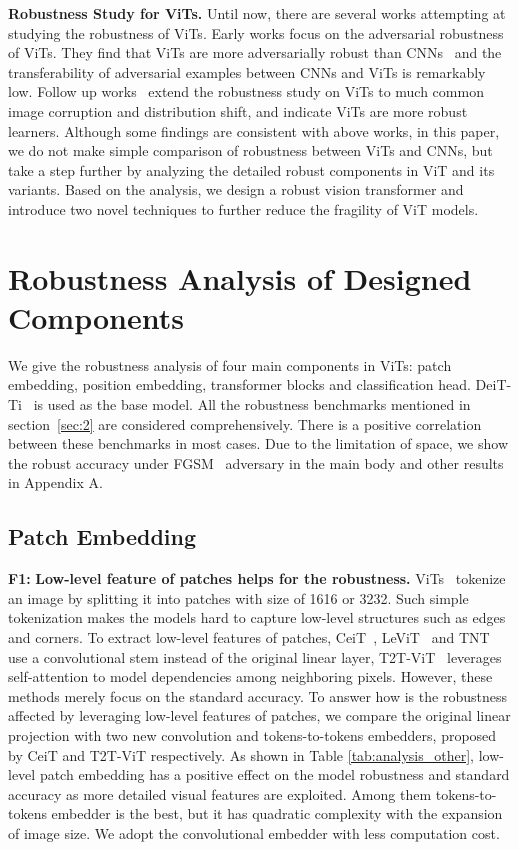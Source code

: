 \documentclass[10pt,twocolumn,letterpaper]{article}
\begin{document}
\textbf{Robustness Study for ViTs.} Until now, there are several works attempting at studying the robustness of ViTs. Early works focus on the adversarial robustness of ViTs. They find that ViTs are more adversarially robust than CNNs~\cite{shao2021adversarial} and the transferability of adversarial examples between CNNs and ViTs is remarkably low\cite{mahmood2021robustness}. Follow up works~\cite{bhojanapalli2021understanding,paul2021vision} extend the robustness study on ViTs to much common image corruption and distribution shift, and indicate ViTs are more robust learners. Although some findings are consistent with above works, in this paper, we do not make simple comparison of robustness between ViTs and CNNs, but take a step further by analyzing the detailed robust components in ViT and its variants. Based on the analysis, we design a robust vision transformer and introduce two novel techniques to further reduce the fragility of ViT models.

\section{Robustness Analysis of Designed Components}
\label{sec:3}

We give the robustness analysis of four main components in ViTs: patch embedding, position embedding, transformer blocks and classification head. DeiT-Ti~\cite{touvron2020training} is used as the base model. All the robustness benchmarks mentioned in section~\ref{sec:2} are considered comprehensively. There is a positive correlation between these benchmarks in most cases. Due to the limitation of space, we show the robust accuracy under FGSM~\cite{goodfellow2014explaining} adversary in the main body and other results in Appendix A.

\subsection{Patch Embedding}
\textbf{F1: } \textbf{Low-level feature of patches helps for the robustness.} ViTs~\cite{dosovitskiy2020image} tokenize an image by splitting it into patches with size of 1616 or 3232. Such simple tokenization makes the models hard to capture low-level structures such as edges and corners. 
To extract low-level features of patches, CeiT~\cite{yuan2021incorporating}, LeViT~\cite{graham2021levit} and TNT~\cite{han2021transformer} use a convolutional stem instead of the original linear layer, T2T-ViT~\cite{yuan2021tokens} leverages self-attention to model dependencies among neighboring pixels. However, these methods merely focus on the standard accuracy. To answer how is the robustness affected by leveraging low-level features of patches, we compare the original linear projection with two new convolution and tokens-to-tokens embedders, proposed by CeiT and T2T-ViT respectively. As shown in Table \ref{tab:analysis_other}, low-level patch embedding has a positive effect on the model robustness and standard accuracy as more detailed visual features are exploited. Among them tokens-to-tokens embedder is the best, but it has quadratic complexity with the expansion of image size. We adopt the convolutional embedder with less computation cost.
\end{document}
